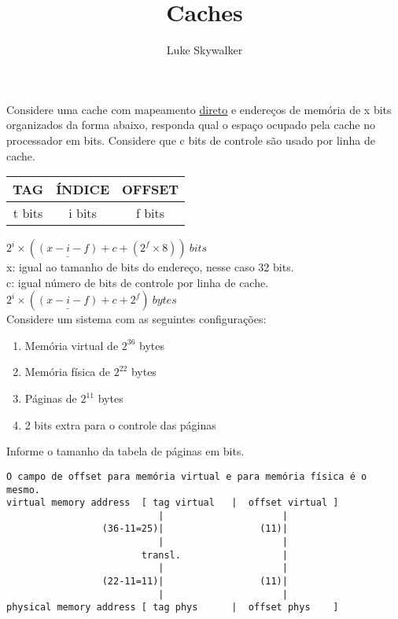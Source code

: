 \documentclass{article}
\author{Luke Skywalker}
\title{Caches}
\begin{document}
\maketitle

Considere uma cache com mapeamento \underline{direto} e endereços de memória de
x bits organizados da forma abaixo, responda qual o espaço ocupado pela cache no
processador em bits. Considere que c bits de controle são usado por linha de
cache.

\begin{table}[ht!]
  \begin{tabular}{|c|c|c|}
    \hline TAG & ÍNDICE & OFFSET \\
    \hline t bits & i bits & f bits \\
    \hline
  \end{tabular}
\end{table}

$2^{i}\times(\underline{(x-i-f)}+c+(2^{f} \times 8))\ bits$\\

\small{x: igual ao tamanho de bits do endereço, nesse caso 32 bits.}\\
\small{c: igual  número de bits de controle por linha de cache.}\\

$2^{i}\times(\underline{(x-i-f)}+c+2^{f})\ bytes$\\

Considere um sistema com as seguintes configurações:

\begin{enumerate}
\item Memória virtual de $2^{36}$ bytes
\item Memória física de $2^{22}$ bytes
\item Páginas de $2^{11}$ bytes
\item 2 bits extra para o controle das páginas
\end{enumerate}

Informe o tamanho da tabela de páginas em bits.

\pagebreak
\begin{verbatim}
O campo de offset para memória virtual e para memória física é o mesmo.
virtual memory address  [ tag virtual   |  offset virtual ]
                           |                     |
                 (36-11=25)|                 (11)|
                           |                     |
                        transl.                  |
                           |                     |
                 (22-11=11)|                 (11)|
                           |                     |
physical memory address [ tag phys      |  offset phys    ]
\end{verbatim}
\end{document}

